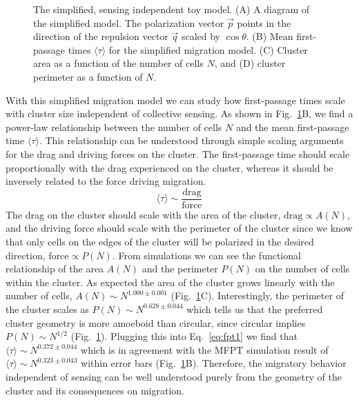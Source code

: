 \documentclass[phys,prelim]{puthesis}
\begin{document}
\begin{figure}[ht]
    \centering
    \caption{The simplified, sensing independent toy model. (A) A diagram of the simplified model. The polarization vector $\vec{p}$ points in the direction of the repulsion vector $\vec{q}$ scaled by $\cos\theta$. (B) Mean first-passage times $\langle\tau\rangle$ for the simplified migration model. (C) Cluster area as a function of the number of cells $N$, and (D) cluster perimeter as a function of $N$.} \label{fig:toyGeo}
\end{figure}

With this simplified migration model we can study how first-passage times scale with cluster size independent of collective sensing. As shown in Fig.\ \ref{fig:toyGeo}B, we find a power-law relationship between the number of cells $N$ and the mean first-passage time $\langle\tau\rangle$. This relationship can be understood through simple scaling arguments for the drag and driving forces on the cluster. The first-passage time should scale proportionally with the drag experienced on the cluster, whereas it should be inversely related to the force driving migration.
\begin{equation} \label{eq:fpt1}
    \langle\tau\rangle \sim \frac{\text{drag}}{\text{force}}
\end{equation}
The drag on the cluster should scale with the area of the cluster, $\text{drag} \propto A(N)$, and the driving force should scale with the perimeter of the cluster since we know that only cells on the edges of the cluster will be polarized in the desired direction, $\text{force} \propto P(N)$. From simulations we can see the functional relationship of the area $A(N)$ and the perimeter $P(N)$ on the number of cells within the cluster. As expected the area of the cluster grows linearly with the number of cells, $A(N) \sim N^{1.000\pm0.001}$ (Fig.\ \ref{fig:toyGeo}C). Interestingly, the perimeter of the cluster scales as $P(N) \sim N^{0.628\pm0.044}$ which tells us that the preferred cluster geometry is more amoeboid than circular, since circular implies $P(N) \sim N^{1/2}$ (Fig.\ \ref{fig:toyGeo}). Plugging this into Eq.\ \ref{eq:fpt1} we find that
$\langle\tau\rangle \sim N^{0.372\pm0.044}$
which is in agreement with the MFPT simulation result of
$\langle\tau\rangle \sim N^{0.323\pm0.043}$
within error bars (Fig.\ \ref{fig:toyGeo}B). Therefore, the migratory behavior independent of sensing can be well understood purely from the geometry of the cluster and its consequences on migration.
\end{document}
